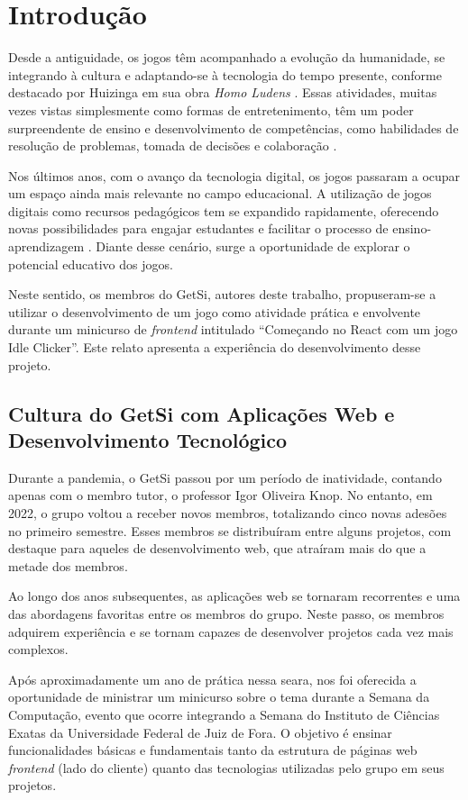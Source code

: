 \section{Introdução}%
\label{sec:introducao}

Desde a antiguidade, os jogos têm acompanhado a evolução da humanidade, se integrando à cultura e adaptando-se à tecnologia do tempo presente, conforme destacado por Huizinga em sua obra \textit{Homo Ludens} \cite{huizinga1971homo}. Essas atividades, muitas vezes vistas simplesmente como formas de entretenimento, têm um poder surpreendente de ensino e desenvolvimento de competências, como habilidades de resolução de problemas, tomada de decisões e colaboração \cite{gee2003what}.

Nos últimos anos, com o avanço da tecnologia digital, os jogos passaram a ocupar um espaço ainda mais relevante no campo educacional. A utilização de jogos digitais como recursos pedagógicos tem se expandido rapidamente, oferecendo novas possibilidades para engajar estudantes e facilitar o processo de ensino-aprendizagem \cite{gee2003what}. Diante desse cenário, surge a oportunidade de explorar o potencial educativo dos jogos.

Neste sentido, os membros do GetSi, autores deste trabalho, propuseram-se a utilizar o desenvolvimento de um jogo como atividade prática e envolvente durante um minicurso de \textit{frontend} intitulado ``Começando no React com um jogo Idle Clicker''. Este relato apresenta a experiência do desenvolvimento desse projeto.

\subsection{Cultura do GetSi com Aplicações Web e Desenvolvimento Tecnológico}

Durante a pandemia, o GetSi passou por um período de inatividade, contando apenas com o membro tutor, o professor Igor Oliveira Knop. No entanto, em 2022, o grupo voltou a receber novos membros, totalizando cinco novas adesões no primeiro semestre. Esses membros se distribuíram entre alguns projetos, com destaque para aqueles de desenvolvimento web, que atraíram mais do que a metade dos membros.

Ao longo dos anos subsequentes, as aplicações web se tornaram recorrentes e uma das abordagens favoritas entre os membros do grupo. Neste passo, os membros adquirem experiência e se tornam capazes de desenvolver projetos cada vez mais complexos.

Após aproximadamente um ano de prática nessa seara, nos foi oferecida a oportunidade de ministrar um minicurso sobre o tema durante a Semana da Computação, evento que ocorre integrando a Semana do Instituto de Ciências Exatas da Universidade Federal de Juiz de Fora. O objetivo é ensinar funcionalidades básicas e fundamentais tanto da estrutura de páginas web \textit{frontend} (lado do cliente) quanto das tecnologias utilizadas pelo grupo em seus projetos.
